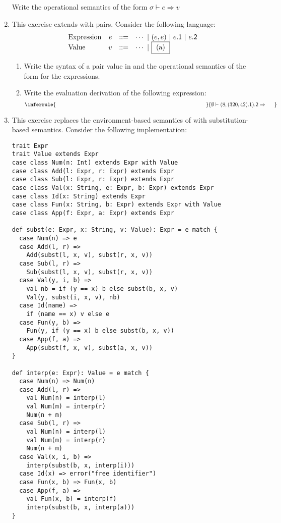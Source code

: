 \begin{enumerate}
Write the operational semantics of the form
$\boxed{\sigma \vdash e \Rightarrow v}$

\item This exercise extends \lang with pairs. Consider the following language:
\[
\begin{array}{lrrl}
  \text{Expression}& e & ::= & \cdots\ |\ (e,e)\ |\ e\textsf{.1}\ |\ e\textsf{.2} \\
  \text{Value} & v & ::= & \cdots\ |\ \fbox{ (a) }
\end{array}
\]

\begin{enumerate}
  \item Write the syntax of a pair value in  and
    the operational semantics of the form  for the expressions.
  \item Write the evaluation derivation of the following expression:
    \[
      \inferrule
      {\hspace*{0.8\textwidth}}
      { \eval{\emptyset}{(8,(320,42)\textsf{.1})\textsf{.2}}{~~~~~} }
    \]
\end{enumerate}

\item This exercise replaces the environment-based semantics of \lang with
substitution-based semantics.
Consider the following implementation:
\begin{verbatim}
trait Expr
trait Value extends Expr
case class Num(n: Int) extends Expr with Value
case class Add(l: Expr, r: Expr) extends Expr
case class Sub(l: Expr, r: Expr) extends Expr
case class Val(x: String, e: Expr, b: Expr) extends Expr
case class Id(x: String) extends Expr
case class Fun(x: String, b: Expr) extends Expr with Value
case class App(f: Expr, a: Expr) extends Expr

def subst(e: Expr, x: String, v: Value): Expr = e match {
  case Num(n) => e
  case Add(l, r) =>
    Add(subst(l, x, v), subst(r, x, v))
  case Sub(l, r) =>
    Sub(subst(l, x, v), subst(r, x, v))
  case Val(y, i, b) =>
    val nb = if (y == x) b else subst(b, x, v)
    Val(y, subst(i, x, v), nb)
  case Id(name) =>
    if (name == x) v else e
  case Fun(y, b) =>
    Fun(y, if (y == x) b else subst(b, x, v))
  case App(f, a) =>
    App(subst(f, x, v), subst(a, x, v))
}

def interp(e: Expr): Value = e match {
  case Num(n) => Num(n)
  case Add(l, r) =>
    val Num(n) = interp(l)
    val Num(m) = interp(r)
    Num(n + m)
  case Sub(l, r) =>
    val Num(n) = interp(l)
    val Num(m) = interp(r)
    Num(n + m)
  case Val(x, i, b) =>
    interp(subst(b, x, interp(i)))
  case Id(x) => error("free identifier")
  case Fun(x, b) => Fun(x, b)
  case App(f, a) =>
    val Fun(x, b) = interp(f)
    interp(subst(b, x, interp(a)))
}
\end{verbatim}


\end{enumerate}
